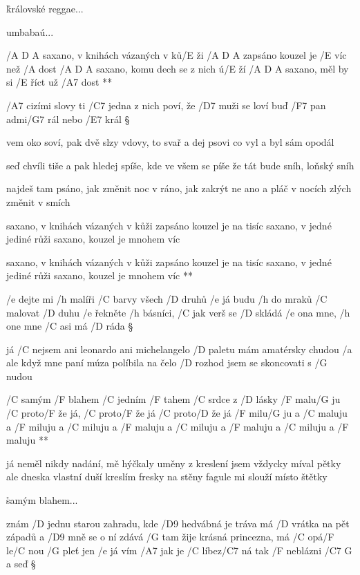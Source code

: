 \r královské reggae...

umbabaú...




\R /{A D A} saxano, v knihách vázaných v ků/E ži 
   /{A D A} zapsáno kouzel je /E víc než /A dost
   /{A D A} saxano, komu dech se z nich ú/E ží 
   /{A D A} saxano, měl by si /E říct už /A7 dost **

/A7 cizími slovy ti /C7 jedna z nich poví, že /D7 muži se loví
buď /F7 pan admi/G7 rál nebo /E7 král \S

vem oko soví, pak dvě slzy vdovy, to svař a dej psovi
co vyl a byl sám opodál \s

seď chvíli tiše a pak hledej spíše, kde ve všem se píše
že tát bude sníh, loňský sníh \s

najdeš tam psáno, jak změnit noc v ráno, jak zakrýt ne ano
a pláč v nocích zlých změnit v smích

\R saxano, v knihách vázaných v kůži
   zapsáno kouzel je na tisíc
   saxano, v jedné jediné růži
   saxano, kouzel je mnohem víc \s

   saxano, v knihách vázaných v kůži
   zapsáno kouzel je na tisíc
   saxano, v jedné jediné růži
   saxano, kouzel je mnohem víc **




/e dejte mi /h malíři /C barvy všech /D druhů 
/e já budu /h do mraků /C malovat /D duhu
/e řekněte /h básníci, /C jak verš se /D skládá 
/e ona mne, /h one mne /C asi má /D ráda \S

já /C nejsem ani leonardo ani michelangelo
/D paletu mám amatérsky chudou
/a ale když mne paní múza políbila na čelo
/D rozhod jsem se skoncovati s /G nudou 

\R  /C samým /F blahem /C jedním /F tahem
    /C srdce z /D lásky /F malu/G ju
    /C proto/F že já, /C proto/F že já
    /C proto/D že já /F milu/G ju
    a /C maluju a /F miluju a /C miluju a /F maluju
    a /C miluju a /F maluju a /C miluju a /F maluju **

já neměl nikdy nadání, mě hýčkaly uměny
z kreslení jsem vždycky míval pětky
ale dneska vlastní duší kreslím fresky na stěny
fagule mi slouží místo štětky

\r  samým blahem...




znám /D jednu starou zahradu, kde /D9 hedvábná je tráva
má /D vrátka na pět západů a /D9 mně se o ní zdává
/G tam žije krásná princezna, má /C opá/F le/C nou /G pleť 
jen /e já vím /A7 jak je /C líbez/C7 ná
tak /F neblázni /{C7 G} a seď \S

